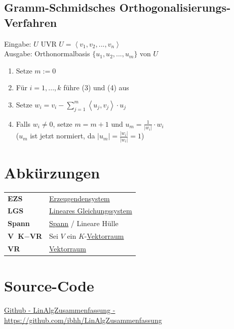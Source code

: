 \documentclass{scrartcl}
\newcommand{\linkTo}[1]{\hyperref[#1]{\underline{#1}}}
\begin{document}
\subsection{Gramm-Schmidsches Orthogonalisierungs-Verfahren}
Eingabe: $U$ UVR \(U = \left< v_1, v_2, ..., v_n \right>\)\\
Ausgabe: Orthonormalbasis \(\{u_1, u_2, ..., u_m\}\) von \(U\)

\begin{enumerate}[label={(\arabic*)}]
\item Setze $m := 0$
\item Für $i = 1, ..., k$ führe (3) und (4) aus
\item Setze $w_i = v_i - \sum_{j = 1}^m \left< u_j, v_j \right> \cdot u_j$
\item Falls $w_i \neq 0$, setze $m = m + 1$ und $u_m = \frac{1}{|w_i|} \cdot w_i$\\
($u_m$ ist jetzt normiert, da $|u_m| = \frac{|w_i|}{|w_i|} = 1$)
\end{enumerate}


\section{Abkürzungen}

\begin{tabular}{p{}p{}}
\textbf{EZS} & \linkTo{Erzeugendensystem}\\
\textbf{LGS}\label{LGS} & \linkTo{Lineares Gleichungssystem} \\
\textbf{Spann} & \linkTo{Spann} / Lineare Hülle\\
\textbf{V~K$-$VR} & Sei $V$ ein $K$-\linkTo{Vektorraum}\\
\textbf{VR} & \linkTo{Vektorraum} \\
\end{tabular}

\section{Source-Code}

\href{https://github.com/ibhh/LinAlgZusammenfassung}{Github - LinAlgZusammenfassung - https://github.com/ibhh/LinAlgZusammenfassung}
\end{document}
